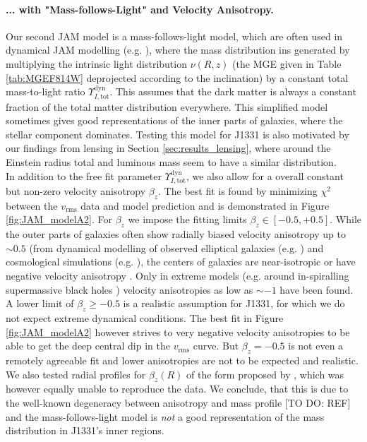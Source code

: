 \paragraph{... with "Mass-follows-Light" and Velocity Anisotropy.} Our second JAM model is a mass-follows-light model, which are often used in dynamical JAM modelling (e.g. \citet{GlennEC,Cap06}), where the mass distribution ins generated by multiplying the intrinsic light distribution $\nu(R,z)$ (the MGE given in Table \ref{tab:MGEF814W} deprojected according to the inclination) by a constant total mass-to-light ratio  $\Upsilon_{I,\text{tot}}^\text{dyn}$. This assumes that the dark matter is always a constant fraction of the total matter distribution everywhere. This simplified model sometimes gives good representations of the inner parts of galaxies, where the stellar component dominates. Testing this model for J1331 is also motivated by our findings from lensing in Section \ref{sec:results_lensing}, where around the Einstein radius total and luminous mass seem to have a similar distribution.
\\In addition to the free fit parameter  $\Upsilon_{I,\text{tot}}^\text{dyn}$, we also allow for a overall constant but non-zero velocity anisotropy $\beta_z$. The best fit is found by minimizing $\chi^2$ between the $v_\text{rms}$ data and model prediction and is demonstrated in Figure \ref{fig:JAM_modelA2}. For $\beta_z$ we impose the fitting limits $\beta_z \in [-0.5,+0.5]$. While the outer parts of galaxies often show radially biased velocity anisotropy up to $\sim 0.5$ (from dynamical modelling of observed elliptical galaxies (e.g. \citet{Kronawitter2000}) and cosmological simulations (e.g. \citet{2004MNRAS.352..535D,2001ApJ...557..533F}), the centers of galaxies are near-isotropic or have  negative velocity anisotropy \citep{2003ApJ...583...92G}. Only in extreme models (e.g. around in-spiralling supermassive black holes \citep{1997NewA....2..533Q}) velocity anisotropies as low as $\sim -1$ have been found. A lower limit of $\beta_z \geq -0.5$ is a realistic assumption for J1331, for which we do not expect extreme dynamical conditions. The best fit in Figure \ref{fig:JAM_modelA2} however strives to very negative velocity anisotropies to be able to get the deep central dip in the  $v_\text{rms}$ curve. But $\beta_z = -0.5$ is not even a remotely agreeable fit and lower anisotropies are not to be expected and realistic. We also tested radial profiles for $\beta_z(R)$ of the form proposed by \citet{BaesVanHese}, which was however equally unable to reproduce the data. We conclude, that this is due to the well-known degeneracy between anisotropy and mass profile [TO DO: REF] and the mass-follows-light model is \emph{not} a good representation of the mass distribution in J1331's inner regions.


